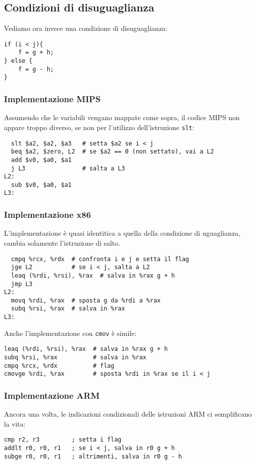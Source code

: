 \documentclass[class=book, crop=false, oneside]{standalone}
\begin{document}
\subsection*{Condizioni di disuguaglianza}
Vediamo ora invece una condizione di disuguaglianza:
\begin{verbatim}
if (i < j){
	f = g + h;
} else {
	f = g - h;
}
\end{verbatim}
\subsubsection{Implementazione MIPS}
Assumendo che le variabili vengano mappate come sopra, il codice MIPS non appare troppo diverso, se non per l'utilizzo dell'istruzione \texttt{slt}:
\begin{verbatim}
  slt $a2, $a2, $a3   # setta $a2 se i < j
  beq $a2, $zero, L2  # se $a2 == 0 (non settato), vai a L2
  add $v0, $a0, $a1
  j L3                # salta a L3
L2:
  sub $v0, $a0, $a1
L3:
\end{verbatim}
\subsubsection{Implementazione x86}
L'implementazione è quasi identitica a quella della condizione di uguaglianza, cambia solamente l'istruzione di salto.
\begin{verbatim}
  cmpq %rcx, %rdx  # confronta i e j e setta il flag
  jge L2           # se i < j, salta a L2
  leaq (%rdi, %rsi), %rax  # salva in %rax g + h
  jmp L3
L2:
  movq %rdi, %rax  # sposta g da %rdi a %rax
  subq %rsi, %rax  # salva in %rax
L3:
\end{verbatim}
Anche l'implementazione con \texttt{cmov} è simile:
\begin{verbatim}
leaq (%rdi, %rsi), %rax  # salva in %rax g + h
subq %rsi, %rax          # salva in %rax
cmpq %rcx, %rdx          # flag
cmovge %rdi, %rax        # sposta %rdi in %rax se il i < j
\end{verbatim}

\subsubsection{Implementazione ARM}
Ancora una volta, le indicazioni condizionali delle istruzioni ARM ci semplificano la vita:
\begin{verbatim}
cmp r2, r3         ; setta i flag
addlt r0, r0, r1   ; se i < j, salva in r0 g + h
subge r0, r0, r1   ; altrimenti, salva in r0 g - h
\end{verbatim}
\end{document}
